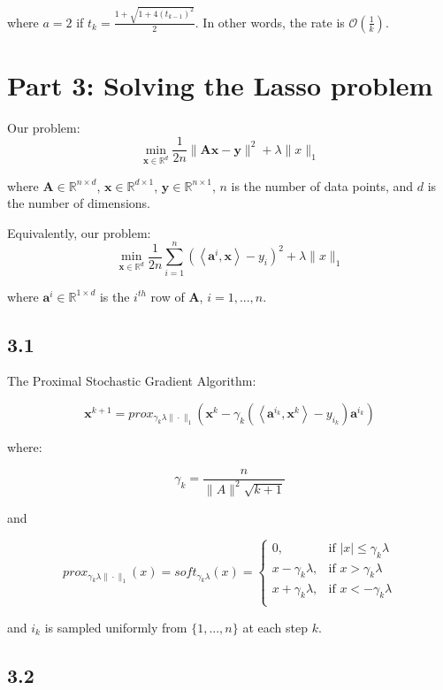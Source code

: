 \documentclass[12pt]{article}
\begin{document}
where $a = 2$ if $t_k = \frac{1+\sqrt{1+ 4 (t_{k-1})^2}}{2}$. In other words, the rate is $\mathcal{O}(\frac{1}{k})$.

\newpage
\section*{Part 3: Solving the Lasso problem}

Our problem:
\[\min_{\textbf{x} \in \mathbb{R}^d} \frac{1}{2n} \|\textbf{Ax}-\textbf{y}\|^2 + \lambda \|x\|_1\]

where $\textbf{A} \in \mathbb{R}^{n\times d}$, $\textbf{x} \in \mathbb{R}^{d \times 1}$, $\textbf{y} \in \mathbb{R}^{n \times 1}$, $n$ is the number of data points, and $d$ is the number of dimensions.

Equivalently, our problem:
\[\min_{\textbf{x} \in \mathbb{R}^d} \frac{1}{2n} \sum_{i=1}^n \left(\left\langle \textbf{a}^i, \textbf{x} \right\rangle - y_i \right)^2 + \lambda \|x\|_1\]

where $\textbf{a}^i \in \mathbb{R}^{1 \times d}$ is the $i^{th}$ row of \textbf{A}, $i=1, ..., n$.

\subsection*{3.1}
The Proximal Stochastic Gradient Algorithm:

\[\textbf{x}^{k+1} = prox_{\gamma_k \lambda \|\cdot\|_1} \left(\textbf{x}^k - \gamma_k \left(\left\langle \textbf{a}^{i_k}, \textbf{x}^{k}\right\rangle - y_{i_k}\right)\textbf{a}^{i_k}\right)\]

where:

\[\gamma_k = \frac{n}{\|A\|^2 \sqrt{k+1}}\]

and

\[prox_{\gamma_k \lambda \|\cdot\|_1}(x) = soft_{\gamma_k \lambda}(x) = \begin{cases}
      0, &  \text{if } |x| \leq \gamma_k \lambda \\
      x-\gamma_k \lambda, & \text{if } x > \gamma_k \lambda \\
      x+\gamma_k \lambda, & \text{if } x < - \gamma_k \lambda \\
   \end{cases}\]

and $i_k$ is sampled uniformly from $\{1, ..., n\}$ at each step $k$.

\subsection*{3.2}
\end{document}
